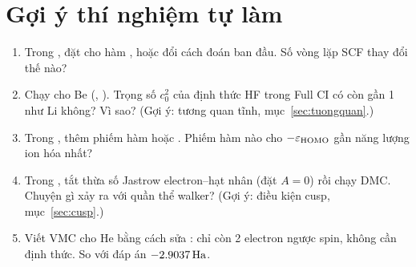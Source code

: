\section*{Gợi ý thí nghiệm tự làm}
\begin{enumerate}
\item Trong , đặt  cho hàm , hoặc đổi cách đoán ban đầu. Số vòng lặp SCF thay đổi thế nào?
\item Chạy  cho Be (, ). Trọng số $c_0^2$ của định thức HF trong Full CI có còn gần 1 như Li không? Vì sao? (Gợi ý: tương quan tĩnh, mục~\ref{sec:tuongquan}.)
\item Trong , thêm phiếm hàm  hoặc . Phiếm hàm nào cho $-\varepsilon_{\rm HOMO}$ gần năng lượng ion hóa nhất?
\item Trong , tắt thừa số Jastrow electron--hạt nhân (đặt $A=0$) rồi chạy DMC. Chuyện gì xảy ra với quần thể walker? (Gợi ý: điều kiện cusp, mục~\ref{sec:cusp}.)
\item Viết VMC cho He bằng cách sửa : chỉ còn 2 electron ngược spin, không cần định thức. So với đáp án $-2.9037\,\mathrm{Ha}$.
\end{enumerate}

